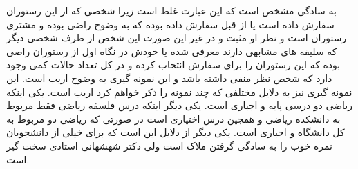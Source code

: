 \problem{}
\subproblem{}
 به سادگی مشخص است که این عبارت غلط است زیرا شخصی که از این رستوران سفارش داده است یا از قبل سفارش داده بوده
 که به وضوح راضی بوده و مشتری رستوران است و نظر او مثبت و در غیر این صورت این شخص از طرف شخصی دیگر
 که سلیقه های مشابهی دارند معرفی شده یا خودش در نگاه اول از رستوران راضی بوده که این رستوران را برای سفارش انتخاب کرده
 و در کل تعداد حالات کمی وجود دارد که شخص نظر منفی داشته باشد و این نمونه گیری به وضوح اریب است.
\newline
\subproblem{} 
این نمونه گیری نیز به دلایل مختلفی که چند نمونه را ذکر خواهم کرد اریب است. یکی اینکه ریاضی دو درسی پایه و اجباری است.
یکی دیگر اینکه درس فلسفه ریاضی فقط مربوط به دانشکده ریاضی و همجین درس اختیاری است در صورتی که 
ریاضی دو مربوط به کل دانشگاه و اجباری است.
یکی دیگر از دلایل این است که برای خیلی از دانشجویان نمره خوب را به سادگی گرفتن ملاک است ولی دکتر شهشهانی استادی
سخت گیر است.